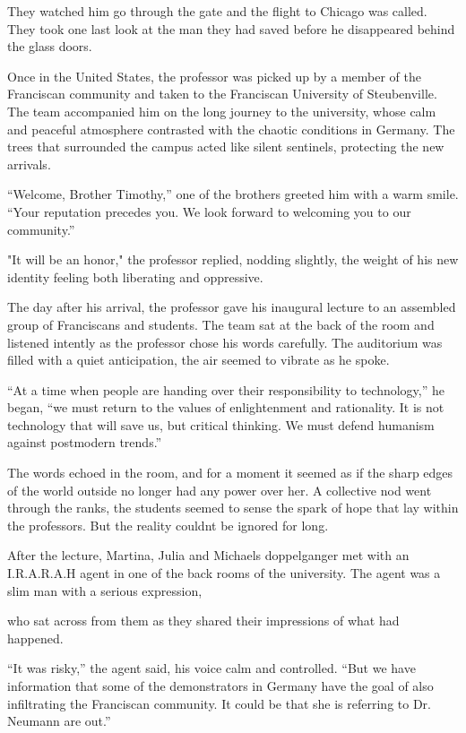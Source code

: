 \documentclass[
]{article}
\begin{document}
They watched him go through the gate and the flight to Chicago was
called. They took one last look at the man they had saved before he
disappeared behind the glass doors.

Once in the United States, the professor was picked up by a member of
the Franciscan community and taken to the Franciscan University of
Steubenville. The team accompanied him on the long journey to the
university, whose calm and peaceful atmosphere contrasted with the
chaotic conditions in Germany. The trees that surrounded the campus
acted like silent sentinels, protecting the new arrivals.

``Welcome, Brother Timothy,'' one of the brothers greeted him with a
warm smile. ``Your reputation precedes you. We look forward to welcoming
you to our community.''

"It will be an honor," the professor replied, nodding slightly, the
weight of his new identity feeling both liberating and oppressive.

The day after his arrival, the professor gave his inaugural lecture to
an assembled group of Franciscans and students. The team sat at the back
of the room and listened intently as the professor chose his words
carefully. The auditorium was filled with a quiet anticipation, the air
seemed to vibrate as he spoke.

``At a time when people are handing over their responsibility to
technology,'' he began, ``we must return to the values
\hspace{0pt}\hspace{0pt}of enlightenment and rationality. It is not
technology that will save us, but critical thinking. We must defend
humanism against postmodern trends.''

The words echoed in the room, and for a moment it seemed as if the sharp
edges of the world outside no longer had any power over her. A
collective nod went through the ranks, the students seemed to sense the
spark of hope that lay within the professors. But the reality
couldn\textquotesingle t be ignored for long.

After the lecture, Martina, Julia and Michael\textquotesingle s
doppelganger met with an I.R.A.R.A.H agent in one of the back rooms of
the university. The agent was a slim man with a serious expression,

who sat across from them as they shared their impressions of what had
happened.

``It was risky,'' the agent said, his voice calm and controlled. ``But
we have information that some of the demonstrators in Germany have the
goal of also infiltrating the Franciscan community. It could be that she
is referring to Dr. Neumann are out.''
\end{document}
